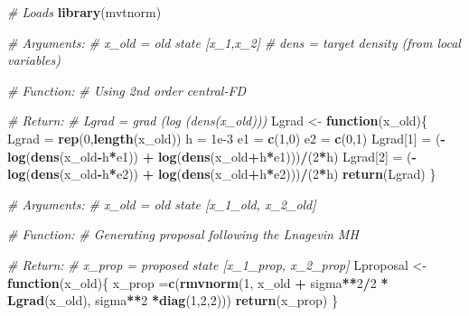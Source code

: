 \documentclass[
]{article}
\newenvironment{Shaded}{\begin{snugshade}}{\end{snugshade}}
\newcommand{\CommentTok}[1]{\textcolor[rgb]{0.56,0.35,0.01}{\textit{#1}}}
\newcommand{\ControlFlowTok}[1]{\textcolor[rgb]{0.13,0.29,0.53}{\textbf{#1}}}
\newcommand{\DecValTok}[1]{\textcolor[rgb]{0.00,0.00,0.81}{#1}}
\newcommand{\FloatTok}[1]{\textcolor[rgb]{0.00,0.00,0.81}{#1}}
\newcommand{\KeywordTok}[1]{\textcolor[rgb]{0.13,0.29,0.53}{\textbf{#1}}}
\newcommand{\NormalTok}[1]{#1}
\newcommand{\OperatorTok}[1]{\textcolor[rgb]{0.81,0.36,0.00}{\textbf{#1}}}
\newcommand{\StringTok}[1]{\textcolor[rgb]{0.31,0.60,0.02}{#1}}
\begin{document}
\begin{Shaded}
\begin{Highlighting}[]
\CommentTok{# Loads}
\KeywordTok{library}\NormalTok{(mvtnorm)}

\CommentTok{# Arguments:}
\CommentTok{# x_old = old state [x_1,x_2]}
\CommentTok{# dens = target density (from local variables)}

\CommentTok{# Function:}
\CommentTok{# Using 2nd order central-FD }

\CommentTok{# Return:}
\CommentTok{# Lgrad = grad (log (dens(x_old)))}
\NormalTok{Lgrad <-}\StringTok{ }\ControlFlowTok{function}\NormalTok{(x_old)\{}
\NormalTok{  Lgrad =}\StringTok{ }\KeywordTok{rep}\NormalTok{(}\DecValTok{0}\NormalTok{,}\KeywordTok{length}\NormalTok{(x_old))}
\NormalTok{  h =}\StringTok{ }\FloatTok{1e-3}
\NormalTok{  e1 =}\StringTok{ }\KeywordTok{c}\NormalTok{(}\DecValTok{1}\NormalTok{,}\DecValTok{0}\NormalTok{)}
\NormalTok{  e2 =}\StringTok{ }\KeywordTok{c}\NormalTok{(}\DecValTok{0}\NormalTok{,}\DecValTok{1}\NormalTok{)}
\NormalTok{  Lgrad[}\DecValTok{1}\NormalTok{] =}\StringTok{ }\NormalTok{(}\OperatorTok{-}\KeywordTok{log}\NormalTok{(}\KeywordTok{dens}\NormalTok{(x_old}\OperatorTok{-}\NormalTok{h}\OperatorTok{*}\NormalTok{e1)) }\OperatorTok{+}\StringTok{ }\KeywordTok{log}\NormalTok{(}\KeywordTok{dens}\NormalTok{(x_old}\OperatorTok{+}\NormalTok{h}\OperatorTok{*}\NormalTok{e1)))}\OperatorTok{/}\NormalTok{(}\DecValTok{2}\OperatorTok{*}\NormalTok{h)}
\NormalTok{  Lgrad[}\DecValTok{2}\NormalTok{] =}\StringTok{ }\NormalTok{(}\OperatorTok{-}\KeywordTok{log}\NormalTok{(}\KeywordTok{dens}\NormalTok{(x_old}\OperatorTok{-}\NormalTok{h}\OperatorTok{*}\NormalTok{e2)) }\OperatorTok{+}\StringTok{ }\KeywordTok{log}\NormalTok{(}\KeywordTok{dens}\NormalTok{(x_old}\OperatorTok{+}\NormalTok{h}\OperatorTok{*}\NormalTok{e2)))}\OperatorTok{/}\NormalTok{(}\DecValTok{2}\OperatorTok{*}\NormalTok{h)}
  \KeywordTok{return}\NormalTok{(Lgrad)}
\NormalTok{\}}

\CommentTok{# Arguments: }
\CommentTok{# x_old = old state [x_1_old, x_2_old]}

\CommentTok{# Function:}
\CommentTok{# Generating proposal following the Lnagevin MH}

\CommentTok{# Return:}
\CommentTok{# x_prop = proposed state [x_1_prop, x_2_prop]}
\NormalTok{Lproposal <-}\StringTok{ }\ControlFlowTok{function}\NormalTok{(x_old)\{}
\NormalTok{  x_prop =}\KeywordTok{c}\NormalTok{(}\KeywordTok{rmvnorm}\NormalTok{(}\DecValTok{1}\NormalTok{, x_old }\OperatorTok{+}\StringTok{ }\NormalTok{sigma}\OperatorTok{**}\DecValTok{2}\OperatorTok{/}\DecValTok{2} \OperatorTok{*}\StringTok{ }\KeywordTok{Lgrad}\NormalTok{(x_old), sigma}\OperatorTok{**}\DecValTok{2} \OperatorTok{*}\KeywordTok{diag}\NormalTok{(}\DecValTok{1}\NormalTok{,}\DecValTok{2}\NormalTok{,}\DecValTok{2}\NormalTok{))) }
  \KeywordTok{return}\NormalTok{(x_prop)}
\NormalTok{\}}


\end{Highlighting}
\end{Shaded}
\end{document}
